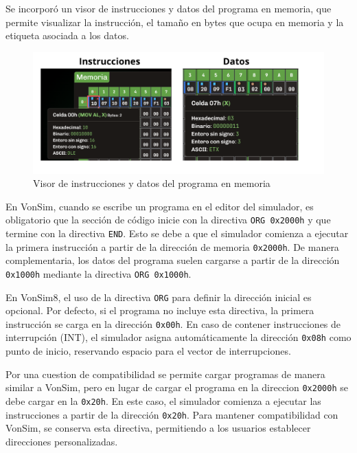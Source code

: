 \documentclass[12pt,oneside]{templates/unerthesis}
\begin{document}
Se incorporó un visor de instrucciones y datos del programa en memoria, que permite visualizar la instrucción, el tamaño en bytes que ocupa en memoria y la etiqueta asociada a los datos.

\begin{figure}

{\centering \includegraphics[width=1\linewidth]{images/visorprog} 

}

\caption{Visor de instrucciones y datos del programa en memoria}\label{fig:visorprog}
\end{figure}

En VonSim, cuando se escribe un programa en el editor del simulador, es obligatorio que la sección de código inicie con la directiva \texttt{ORG\ 0x2000h} y que termine con la directiva \texttt{END}. Esto se debe a que el simulador comienza a ejecutar la primera instrucción a partir de la dirección de memoria \texttt{0x2000h}. De manera complementaria, los datos del programa suelen cargarse a partir de la dirección \texttt{0x1000h} mediante la directiva \texttt{ORG\ 0x1000h}.

En VonSim8, el uso de la directiva \texttt{ORG} para definir la dirección inicial es opcional. Por defecto, si el programa no incluye esta directiva, la primera instrucción se carga en la dirección \texttt{0x00h}. En caso de contener instrucciones de interrupción (INT), el simulador asigna automáticamente la dirección \texttt{0x08h} como punto de inicio, reservando espacio para el vector de interrupciones.

Por una cuestion de compatibilidad se permite cargar programas de manera similar a VonSim, pero en lugar de cargar el programa en la direccion \texttt{0x2000h} se debe cargar en la \texttt{0x20h}. En este caso, el simulador comienza a ejecutar las instrucciones a partir de la dirección \texttt{0x20h}. Para mantener compatibilidad con VonSim, se conserva esta directiva, permitiendo a los usuarios establecer direcciones personalizadas.
\end{document}
